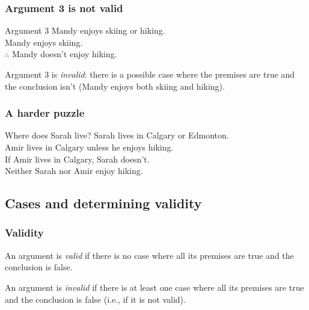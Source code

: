 \begin{frame}
  \frametitle{Argument 3 is not valid}

  \begin{block}{Argument 3}
  Mandy enjoys skiing or hiking.\\
  Mandy enjoys skiing.\\
  $\therefore$ Mandy doesn't enjoy hiking.
  \end{block}

  Argument 3 is \emph{invalid}: there is a possible case where the
  premises are true and the conclusion isn't (Mandy enjoys both skiing
  and hiking).

\end{frame}

\begin{frame}
  \frametitle{A harder puzzle}

  \begin{block}{Where does Sarah live?}
  Sarah lives in Calgary or Edmonton.\\
  Amir lives in Calgary unless he enjoys hiking.\\
  If Amir lives in Calgary, Sarah doesn't.\\
  Neither Sarah nor Amir enjoy hiking.
  \end{block}

\end{frame}

\subsection{Cases and determining validity}

\begin{frame}
  \frametitle{Validity}

  \begin{definition}
  An argument is \emph{valid} if there is no case where all its
  premises are true and the conclusion is false.
  \end{definition}

  \begin{definition}
  An argument is \emph{invalid} if there is at least one case where
  all its premises are true and the conclusion is false (i.e., if it
  is not valid).
  \end{definition}
\end{frame}

